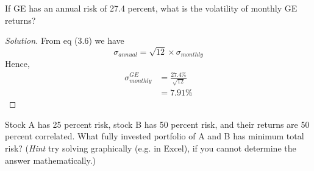 \begin{problem}{3.1}
  If GE has an annual risk of 27.4 percent, what is the volatility of monthly GE returns?
\end{problem}

\begin{proof}[Solution]
  From eq (3.6) we have
  \begin{equation*}
   \sigma_{annual}=\sqrt{12}\times\sigma_{monthly}
  \end{equation*}
  Hence,
  \begin{align*}
   \sigma_{monthly}^{GE}&=\frac{27.4\%}{\sqrt{12}} \\
			&=7.91\%
  \end{align*}
\end{proof}


\begin{problem}{3.2}
 Stock A has 25 percent risk, stock B has 50 percent risk, and their returns are 50 percent correlated. What fully invested portfolio of A and B has minimum total risk? (\textit{Hint} try solving graphically (e.g. in Excel), if you cannot determine the answer mathematically.)
\end{problem}

